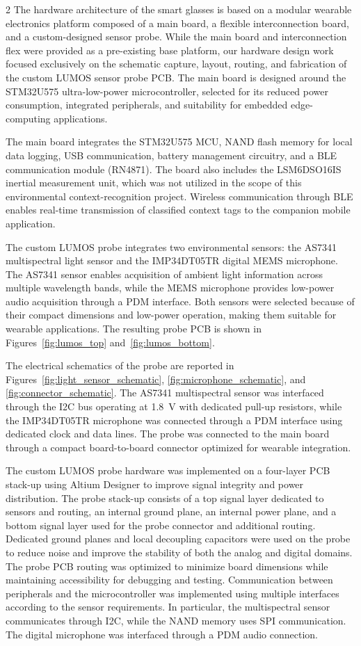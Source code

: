 \documentclass[10pt]{article}
\begin{document}
\begin{multicols}{2}
The hardware architecture of the smart glasses is based on a modular wearable electronics platform composed of a main board, a flexible interconnection board, and a custom-designed sensor probe. While the main board and interconnection flex were provided as a pre-existing base platform, our hardware design work focused exclusively on the schematic capture, layout, routing, and fabrication of the custom LUMOS sensor probe PCB. The main board is designed around the STM32U575 ultra-low-power microcontroller, selected for its reduced power consumption, integrated peripherals, and suitability for embedded edge-computing applications.

The main board integrates the STM32U575 MCU, NAND flash memory for local data logging, USB communication, battery management circuitry, and a BLE communication module (RN4871). The board also includes the LSM6DSO16IS inertial measurement unit, which was not utilized in the scope of this environmental context-recognition project. Wireless communication through BLE enables real-time transmission of classified context tags to the companion mobile application.

The custom LUMOS probe integrates two environmental sensors: the AS7341 multispectral light sensor and the IMP34DT05TR digital MEMS microphone. The AS7341 sensor enables acquisition of ambient light information across multiple wavelength bands, while the MEMS microphone provides low-power audio acquisition through a PDM interface. Both sensors were selected because of their compact dimensions and low-power operation, making them suitable for wearable applications. The resulting probe PCB is shown in Figures~\ref{fig:lumos_top} and~\ref{fig:lumos_bottom}. 

The electrical schematics of the probe are reported in Figures~\ref{fig:light_sensor_schematic}, \ref{fig:microphone_schematic}, and \ref{fig:connector_schematic}. The AS7341 multispectral sensor was interfaced through the I2C bus operating at 1.8~V with dedicated pull-up resistors, while the IMP34DT05TR microphone was connected through a PDM interface using dedicated clock and data lines. The probe was connected to the main board through a compact board-to-board connector optimized for wearable integration.

The custom LUMOS probe hardware was implemented on a four-layer PCB stack-up using Altium Designer to improve signal integrity and power distribution. The probe stack-up consists of a top signal layer dedicated to sensors and routing, an internal ground plane, an internal power plane, and a bottom signal layer used for the probe connector and additional routing. Dedicated ground planes and local decoupling capacitors were used on the probe to reduce noise and improve the stability of both the analog and digital domains. The probe PCB routing was optimized to minimize board dimensions while maintaining accessibility for debugging and testing. Communication between peripherals and the microcontroller was implemented using multiple interfaces according to the sensor requirements. In particular, the multispectral sensor communicates through I2C, while the NAND memory uses SPI communication. The digital microphone was interfaced through a PDM audio connection.


\end{multicols}
\end{document}
